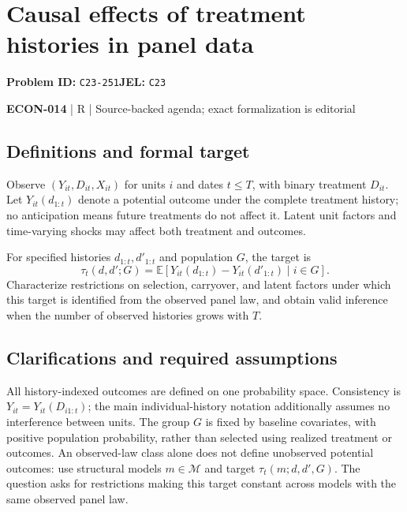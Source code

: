 \documentclass[11pt,a4paper]{article}
\begin{document}
\section*{Causal effects of treatment histories in panel data}
\textbf{Problem ID:} \texttt{C23-251}\quad \textbf{JEL:} \texttt{C23}\par
\label{problem:OP-0599}


\label{audited:ECON-014}

{\sffamily\small\color{muted}\textbf{ECON-014} | R | Source-backed agenda; exact formalization is editorial\par}

\subsection*{Definitions and formal target}

Observe $(Y_{it},D_{it},X_{it})$ for units $i$ and dates $t\leq T$, with binary treatment $D_{it}$. Let $Y_{it}(d_{1:t})$ denote a potential outcome under the complete treatment history; no anticipation means future treatments do not affect it. Latent unit factors and time-varying shocks may affect both treatment and outcomes.

For specified histories $d_{1:t},d'_{1:t}$ and population $G$, the target is
\[
 \tau_t(d,d';G)=\mathbb E[Y_{it}(d_{1:t})-Y_{it}(d'_{1:t})\mid i\in G].
\]
Characterize restrictions on selection, carryover, and latent factors under which this target is identified from the observed panel law, and obtain valid inference when the number of observed histories grows with $T$.

\subsection*{Clarifications and required assumptions}

All history-indexed outcomes are defined on one probability space. Consistency is $Y_{it}=Y_{it}(D_{i1:t})$; the main individual-history notation additionally assumes no interference between units. The group $G$ is fixed by baseline covariates, with positive population probability, rather than selected using realized treatment or outcomes. An observed-law class alone does not define unobserved potential outcomes: use structural models $m\in\mathcal M$ and target $\tau_t(m;d,d',G)$. The question asks for restrictions making this target constant across models with the same observed panel law.
\end{document}

